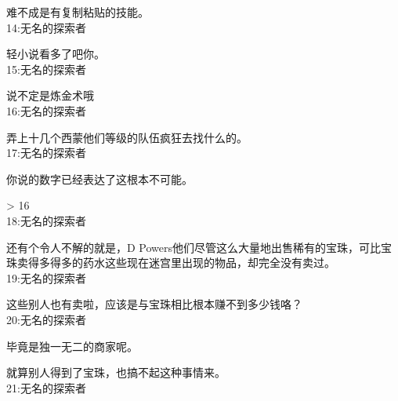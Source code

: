 难不成是有复制粘贴的技能。\\

14:无名的探索者

轻小说看多了吧你。\\

15:无名的探索者

说不定是炼金术哦\\

16:无名的探索者

弄上十几个西蒙他们等级的队伍疯狂去找什么的。\\

17:无名的探索者

你说的数字已经表达了这根本不可能。

> 16\\

18:无名的探索者

还有个令人不解的就是，D Powers他们尽管这么大量地出售稀有的宝珠，可比宝珠卖得多得多的药水这些现在迷宫里出现的物品，却完全没有卖过。\\

19:无名的探索者

这些别人也有卖啦，应该是与宝珠相比根本赚不到多少钱咯？\\

20:无名的探索者

毕竟是独一无二的商家呢。

就算别人得到了宝珠，也搞不起这种事情来。\\

21:无名的探索者

